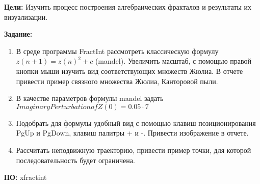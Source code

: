 

\textbf{Цели:} Изучить процесс построения алгебраических фракталов и результаты их визуализации.

\textbf{Задание:}
\begin{enumerate}

\item В среде программы FractInt рассмотреть классическую формулу $z(n + 1) = z(n)^{2}+c$ (mandel). Увеличить масштаб, с помощью правой кнопки мыши изучить вид соответствующих множеств Жюлиа. В отчете привести пример связного множества Жюлиа, Канторовой пыли.

\item В качестве параметров формулы mandel задать $Imaginary Perturbation of Z(0) = 0.05 \cdot 7$

\item Подобрать для формулы удобный вид с помощью клавиш позиционирования PgUp и PgDown, клавиш палитры + и -. Привести изображение в отчете.

\item Рассчитать неподвижную траекторию, привести пример точки, для которой последовательность будет ограничена.
\end{enumerate}

\textbf{ПО:} xfractint

\pagebreak